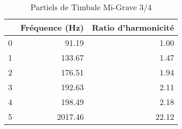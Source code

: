 \begin{table}
\centering
\caption{Partiels de Timbale Mi-Grave 3/4}
\label{table:partiels-timbale-migrave-3.wav}
\begin{tabular}{lrr}
\toprule
{} &  Fréquence (Hz) &  Ratio d'harmonicité \\
\midrule
0 &           91.19 &                 1.00 \\
1 &          133.67 &                 1.47 \\
2 &          176.51 &                 1.94 \\
3 &          192.63 &                 2.11 \\
4 &          198.49 &                 2.18 \\
5 &         2017.46 &                22.12 \\
\bottomrule
\end{tabular}
\end{table}

